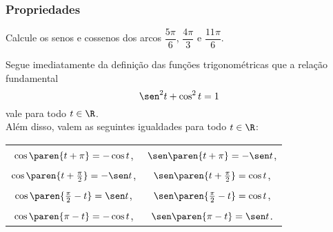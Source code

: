\begin{frame}
\frametitle{Propriedades} 

\begin{exemplo}
    Calcule os senos e cossenos dos arcos $\dfrac {5 \pi} 6$, $ \dfrac {4 \pi} 3$ e $\dfrac {11 \pi} 6$.
\end{exemplo}\pause

Segue imediatamente da definição das funções trigonométricas que a
relação fundamental $$ \sen^2 t + \cos^2 t = 1$$ vale para todo $t
\in \R$. \\
Além disso, valem as seguintes igualdades para todo $t \in \R$:
\begin{center}
\begin{tabular}{ c c }
		$\cos \paren{t+ \pi} = -\cos t$, & $\sen \paren{t+ \pi} = -\sen t$, \\
		$\cos \paren{t+ \frac {\pi} 2} = -\sen t$, & $\sen \paren{t+ \frac {\pi} 2} = \cos t$, \\
		$\cos \paren{ \frac {\pi} 2 -t} = \sen t$, & $\sen \paren{ \frac {\pi} 2 -t} = \cos t$, \\
		$\cos \paren{ \pi -t} = -\cos t$, & $\sen \paren{ \pi -t} = \sen t$. \\
	\end{tabular}
\end{center}

\end{frame}

